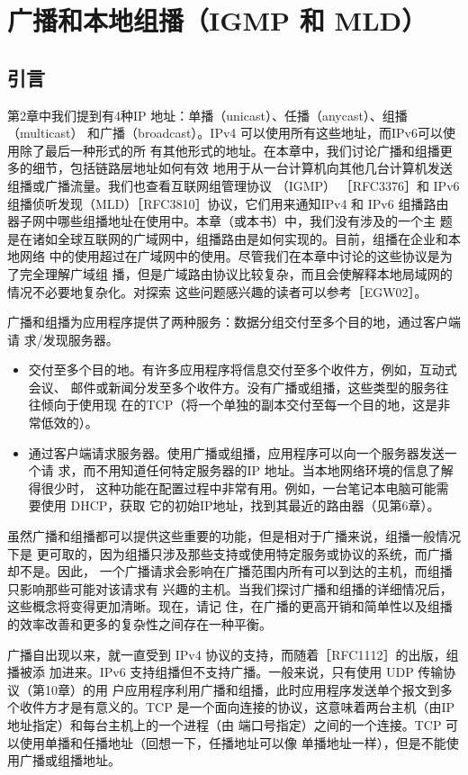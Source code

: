 \chapter{广播和本地组播（IGMP 和 MLD）}

\minitoc
\section{引言}
第2章中我们提到有4种IP 地址：单播（unicast）、任播（anycast）、组播（multicast）
和广播（broadcast）。IPv4 可以使用所有这些地址，而IPv6可以使用除了最后一种形式的所
有其他形式的地址。在本章中，我们讨论广播和组播更多的细节，包括链路层地址如何有效
地用于从一台计算机向其他几台计算机发送组播或广播流量。我们也查看互联网组管理协议
（IGMP） ［RFC3376］和 IPv6组播侦听发现（MLD）［RFC3810］协议，它们用来通知IPv4 和
IPv6 组播路由器子网中哪些组播地址在使用中。本章（或本书）中，我们没有涉及的一个主
题是在诸如全球互联网的广域网中，组播路由是如何实现的。目前，组播在企业和本地网络
中的使用超过在广域网中的使用。尽管我们在本章中讨论的这些协议是为了完全理解广域组
播，但是广域路由协议比较复杂，而且会使解释本地局域网的情况不必要地复杂化。对探索
这些问题感兴趣的读者可以参考［EGW02］。

广播和组播为应用程序提供了两种服务：数据分组交付至多个目的地，通过客户端请
求/发现服务器。

\begin{itemize}
    \item 交付至多个目的地。有许多应用程序将信息交付至多个收件方，例如，互动式会议、
    邮件或新闻分发至多个收件方。没有广播或组播，这些类型的服务往往倾向于使用现
    在的TCP（将一个单独的副本交付至每一个目的地，这是非常低效的）。
    \item 通过客户端请求服务器。使用广播或组播，应用程序可以向一个服务器发送一个请
    求，而不用知道任何特定服务器的IP 地址。当本地网络环境的信息了解得很少时，
    这种功能在配置过程中非常有用。例如，一台笔记本电脑可能需要使用 DHCP，获取
    它的初始IP地址，找到其最近的路由器（见第6章）。
\end{itemize}

虽然广播和组播都可以提供这些重要的功能，但是相对于广播来说，组播一般情况下是
更可取的，因为组播只涉及那些支持或使用特定服务或协议的系统，而广播却不是。因此，
一个广播请求会影响在广播范围内所有可以到达的主机，而组播只影响那些可能对该请求有
兴趣的主机。当我们探讨广播和组播的详细情况后，这些概念将变得更加清晰。现在，请记
住，在广播的更高开销和简单性以及组播的效率改善和更多的复杂性之间存在一种平衡。

广播自出现以来，就一直受到 IPv4 协议的支持，而随着［RFC1112］的出版，组播被添
加进来。IPv6 支持组播但不支持广播。一般来说，只有使用 UDP 传输协议（第10章）的用
户应用程序利用广播和组播，此时应用程序发送单个报文到多个收件方才是有意义的。TCP
是一个面向连接的协议，这意味着两台主机（由IP地址指定）和每台主机上的一个进程（由
端口号指定）之间的一个连接。TCP 可以使用单播和任播地址（回想一下，任播地址可以像
单播地址一样），但是不能使用广播或组播地址。


